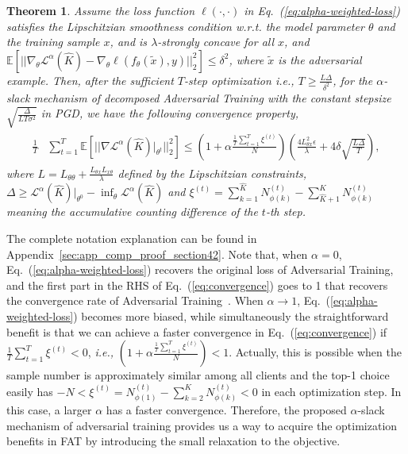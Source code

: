 \documentclass{article} %
\newcommand{\xadv}{\tilde{{x}}}
\theoremstyle{plain}
\newtheorem{theorem}{Theorem}[section]
\theoremstyle{definition}
\theoremstyle{remark}
\begin{document}
\begin{theorem}\label{theorem:convergence}
Assume the loss function $\ell(\cdot, \cdot)$ in Eq.~(\ref{eq:alpha-weighted-loss}) satisfies the Lipschitzian smoothness condition \textit{w.r.t.} the model parameter $\theta$ and the training sample $x$, and is $\lambda$-strongly concave for all $x$, and $\mathbb{E}\left[||\nabla_{\theta} \mathcal{L}^\alpha(\widehat{K}) - \nabla_\theta\ell(f_{\theta}(\xadv),y)||^2_2\right]\leq \delta^2$, 
{where $\tilde{x}$ is the adversarial example}. Then, 
after the sufficient $T$-step optimization \textit{i.e.,} $T\geq \frac{L\Delta}{\delta^2}$, for the $\alpha$-slack mechanism of decomposed Adversarial Training with the constant stepsize $\sqrt{\frac{\Delta}{LT\sigma^2}}$ in PGD, we have the following convergence property,
\begin{align} \label{eq:convergence}
    \begin{split}
        \frac{1}{T} & \sum_{t=1}^T\mathbb{E}\left[\bigg|\bigg|\nabla \mathcal{L}^\alpha(\widehat{K})\big|_{\theta^t}\bigg|\bigg|^2_2\right]  \leq  \left(1+\alpha\frac{\frac{1}{T}\sum_{t=1}^T\xi^{(t)}}{N}\right) \left(\frac{4L^2_{\theta x}\epsilon}{\lambda}+4\delta\sqrt{\frac{L\Delta}{T}}\right), 
    \end{split}
\end{align}
where $L=L_{\theta\theta}+\frac{L_{\theta x}L_{x\theta}}{\lambda}$ defined by the Lipschitzian constraints, $\Delta\geq\mathcal{L}^\alpha(\widehat{K})|_{\theta^0}-\inf_\theta\mathcal{L}^\alpha(\widehat{K})$ and $\xi^{(t)}=\sum_{k=1}^{\widehat{K}} N_{\phi(k)}^{(t)} - \sum_{\widehat{K}+1}^{K} N_{\phi(k)}^{(t)}$ meaning the accumulative counting difference of the $t$-th step.
\end{theorem}

The complete notation explanation can be found in Appendix~\ref{sec:app_comp_proof_section42}. Note that, when $\alpha=0$, Eq.~(\ref{eq:alpha-weighted-loss}) recovers the original loss of Adversarial Training, and the first part in the RHS of Eq.~(\ref{eq:convergence}) goes to 1 that recovers the convergence rate of Adversarial Training~\citep{sinha2018certifying}. When $\alpha\rightarrow 1$, Eq.~(\ref{eq:alpha-weighted-loss}) becomes more biased, while simultaneously the straightforward benefit is that we can achieve a faster convergence in Eq.~(\ref{eq:convergence}) if $\frac{1}{T}\sum_{t=1}^T\xi^{(t)}< 0$, \textit{i.e.,} $\left(1+\alpha\frac{\frac{1}{T}\sum_{t=1}^T\xi^{(t)}}{N}\right)< 1$. Actually, this is possible when the sample number is approximately 
similar among all clients and the top-1 choice easily has $-N<\xi^{(t)}= N_{\phi(1)}^{(t)} - \sum_{k=2}^{K} N_{\phi(k)}^{(t)}<0$ in each optimization step. In this case, a larger $\alpha$ has a faster convergence. Therefore, the proposed $\alpha$-slack mechanism of adversarial training provides us a way to acquire the optimization benefits in FAT by introducing the small relaxation to the objective.
\end{document}
